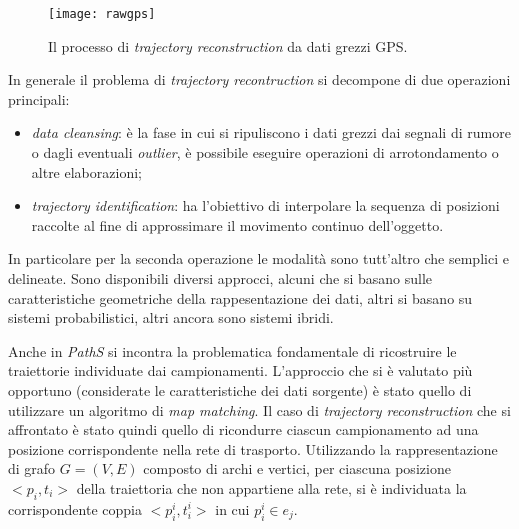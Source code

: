 \begin{figure}[h]
  \centering
  \texttt{[image: rawgps]}
  \caption{\footnotesize{Il processo di \emph{trajectory reconstruction} da dati grezzi GPS.}}
  \label{fig:rawgps}
\end{figure}

In generale il problema di \emph{trajectory recontruction} si decompone di due operazioni principali:
\begin{itemize}
\item \emph{data cleansing}: è la fase in cui si ripuliscono i dati grezzi dai segnali di rumore o dagli eventuali \emph{outlier}, è possibile eseguire operazioni di arrotondamento o altre elaborazioni;
\item \emph{trajectory identification}: ha l'obiettivo di interpolare la sequenza di posizioni raccolte al fine di approssimare il movimento continuo dell'oggetto.
\end{itemize}
In particolare per la seconda operazione le modalità sono tutt'altro che semplici e delineate. Sono disponibili diversi approcci, alcuni che si basano sulle caratteristiche geometriche della rappesentazione dei dati, altri si basano su sistemi probabilistici, altri ancora sono sistemi ibridi.

Anche in \emph{PathS} si incontra la problematica fondamentale di ricostruire le traiettorie individuate dai campionamenti. L'approccio che si è valutato più opportuno (considerate le caratteristiche dei dati sorgente) è stato quello di utilizzare un algoritmo di \emph{map matching}.
Il caso di \emph{trajectory reconstruction} che si affrontato è stato quindi quello di ricondurre ciascun campionamento ad una posizione corrispondente nella rete di trasporto. Utilizzando la rappresentazione di grafo $G=(V,E)$ composto di archi e vertici, per ciascuna posizione $<p_i, t_i>$ della traiettoria che non appartiene alla rete, si è individuata la corrispondente coppia $<p_i^i, t_i^i>$ in cui $p_i^i \in e_j$.

